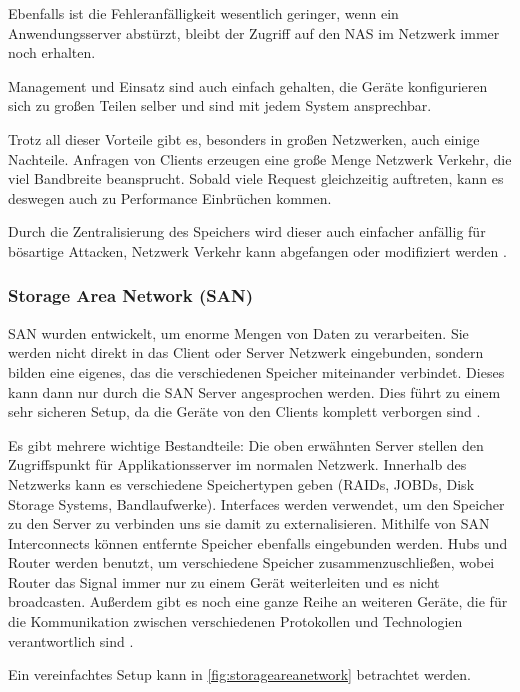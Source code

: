 Ebenfalls ist die Fehleranfälligkeit wesentlich geringer, wenn ein Anwendungsserver abstürzt, bleibt der Zugriff auf den NAS im Netzwerk immer noch erhalten.

Management und Einsatz sind auch einfach gehalten, die Geräte konfigurieren sich zu großen Teilen selber und sind mit jedem System ansprechbar.

Trotz all dieser Vorteile gibt es, besonders in großen Netzwerken, auch einige Nachteile. Anfragen von Clients erzeugen eine große Menge Netzwerk Verkehr, die viel Bandbreite beansprucht. Sobald viele Request gleichzeitig auftreten, kann es deswegen auch zu Performance Einbrüchen kommen.

Durch die Zentralisierung des Speichers wird dieser auch einfacher anfällig für bösartige Attacken, Netzwerk Verkehr kann abgefangen oder modifiziert werden \parencite[Kap. 1, Adv. and Disadv. of NAS Devices]{gupta.2002}.


\subsubsection{Storage Area Network (SAN)}
SAN wurden entwickelt, um enorme Mengen von Daten zu verarbeiten. Sie werden nicht direkt in das Client oder Server Netzwerk eingebunden, sondern bilden eine eigenes, das die verschiedenen Speicher miteinander verbindet. Dieses kann dann nur durch die SAN Server angesprochen werden. Dies führt zu einem sehr sicheren Setup, da die Geräte von den Clients komplett verborgen sind \parencite[Kap. 1, SANs]{gupta.2002}.

Es gibt mehrere wichtige Bestandteile: Die oben erwähnten Server stellen den Zugriffspunkt für Applikationsserver im normalen Netzwerk. Innerhalb des Netzwerks kann es verschiedene Speichertypen geben (RAIDs, JOBDs, Disk Storage Systems, Bandlaufwerke).
Interfaces werden verwendet, um den Speicher zu den Server zu verbinden uns sie damit zu externalisieren. Mithilfe von SAN Interconnects können entfernte Speicher ebenfalls eingebunden werden. Hubs und Router werden benutzt, um verschiedene Speicher zusammenzuschließen, wobei Router das Signal immer nur zu einem Gerät weiterleiten und es nicht broadcasten.
Außerdem gibt es noch eine ganze Reihe an weiteren Geräte, die für die Kommunikation zwischen verschiedenen Protokollen und Technologien verantwortlich sind \parencite[Kap. 2, SAN Components and Building Blocks]{gupta.2002}.

Ein vereinfachtes Setup kann in \autoref{fig:storageareanetwork} betrachtet werden.

